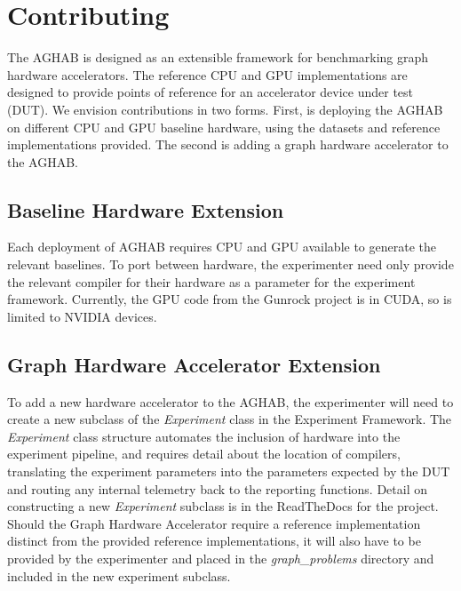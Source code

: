 \section{Contributing}\label{section:contributing}
The AGHAB is designed as an extensible framework for benchmarking graph hardware accelerators. 
The reference CPU and GPU implementations are designed to provide points of reference for an accelerator device under test (DUT). 
We envision contributions in two forms. 
First, is deploying the AGHAB on different CPU and GPU baseline hardware, using the datasets and reference implementations provided. 
The second is adding a graph hardware accelerator to the AGHAB. 

\subsection{Baseline Hardware Extension}
Each deployment of AGHAB requires CPU and GPU available to generate the relevant baselines. 
To port between hardware, the experimenter need only provide the relevant compiler for their hardware as a parameter for the experiment framework. 
Currently, the GPU code from the Gunrock project is in CUDA, so is limited to NVIDIA devices.

\subsection{Graph Hardware Accelerator Extension}
To add a new hardware accelerator to the AGHAB, the experimenter will need to create a new subclass of the \textit{Experiment} class in the Experiment Framework. 
The \textit{Experiment} class structure automates the inclusion of hardware into the experiment pipeline, and requires detail about the location of compilers, translating the experiment parameters into the parameters expected by the DUT and routing any internal telemetry back to the reporting functions. 
Detail on constructing a new \textit{Experiment} subclass is in the ReadTheDocs for the project.
Should the Graph Hardware Accelerator require a reference implementation distinct from the provided reference implementations, it will also have to be provided by the experimenter and placed in the \textit{graph\_problems} directory and included in the new experiment subclass.
